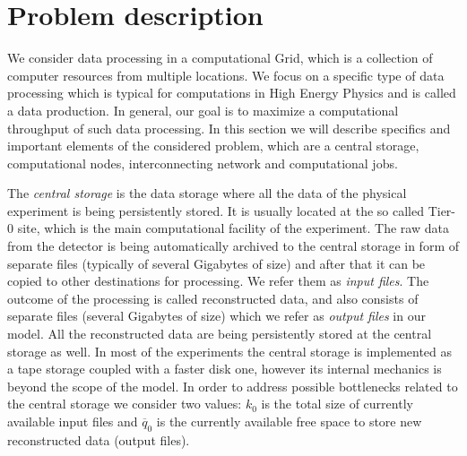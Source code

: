 \documentclass{svjour3}                     %
\begin{document}
\section{Problem description}
\label{problem}
We consider data processing in a computational Grid, which is a collection of computer resources from multiple locations.  We focus on a specific type of data processing which is typical for computations in High Energy Physics and is called a data production. In general, our goal is to maximize a computational throughput of such data processing. In this section we will describe specifics and important elements of the considered problem, which are a central storage, computational nodes, interconnecting network and computational jobs.

The \textit{central storage} is the data storage where all the data of the physical experiment is being persistently stored. It is usually located at the so called Tier-0 site, which is the main computational facility of the experiment.  The raw data from the detector is being automatically archived to the central storage in form of separate files (typically of several Gigabytes of size) and after that it can be copied to other destinations for processing. We refer them as \textit{input files}. The outcome of the processing is called reconstructed data, and also consists of separate files (several Gigabytes of size) which we refer as \textit{output files} in our model. All the reconstructed data are being persistently stored at the central storage as well. In most of the experiments the central storage is implemented as a tape storage coupled with a faster disk one, however its internal mechanics is beyond the scope of the model. In order to address possible bottlenecks related to the central storage we consider two values: $k_{0}$ is the total size of currently available input files and $\overline{q}_{0}$ is the currently available free space to store new reconstructed data (output files).
\end{document}
